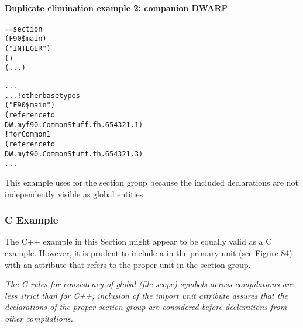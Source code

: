 \paragraph{Duplicate elimination example 2: companion DWARF }
\label{app:duplicateeliminationexample2companiondwarf}

\begin{alltt}
== section 
        (F90\$main)
            ("INTEGER")
            ()
            (...)

            ...
        ...  ! other base types
            ("F90\$main")
                (reference to
                    DW.myf90.CommonStuff.fh.654321.1)
             ! for Common1
                (reference to
                    DW.myf90.CommonStuff.fh.654321.3)
            ...
\end{alltt}


This example uses  for the section group
because the included declarations are not independently
visible as global entities.


\subsubsection{C Example}

The C++ example in this Section might appear to be equally
valid as a C example. However, it is prudent to include
a  in the primary unit (see Figure 84)
with an  attribute that refers to the proper unit
in the section group.

\textit{The C rules for consistency of global (file scope) symbols
across compilations are less strict than for C++; inclusion
of the import unit attribute assures that the declarations of
the proper section group are considered before declarations
from other compilations.}


